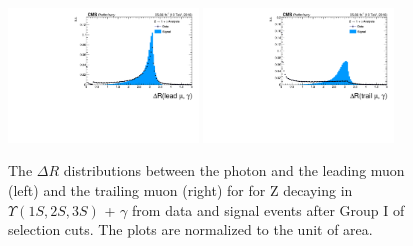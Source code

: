 \begin{figure}[!htbp]
\begin{center}
\includegraphics[width=0.45\textwidth]{figures_and_tables/outputPlots/ZtoUpsilon_Cat0_ZZZZZ/au/data_x_mc/noKinCuts/h_noKin_deltaR_Leading_Photon}\hspace*{1.cm}
\includegraphics[width=0.45\textwidth]{figures_and_tables/outputPlots/ZtoUpsilon_Cat0_ZZZZZ/au/data_x_mc/noKinCuts/h_noKin_deltaR_Trailing_Photon}\end{center}\vspace*{-.5cm}
\caption{The $\Delta R$ distributions between the photon and the leading muon (left) and the trailing muon (right) for for Z decaying in $\Upsilon(1S,2S,3S)$ + $\gamma$ from data and signal events after Group I of selection cuts. The plots are normalized to the unit of area.}
\label{fig:deltaR_ZtoUpsilon_Cat0}
\end{figure}

